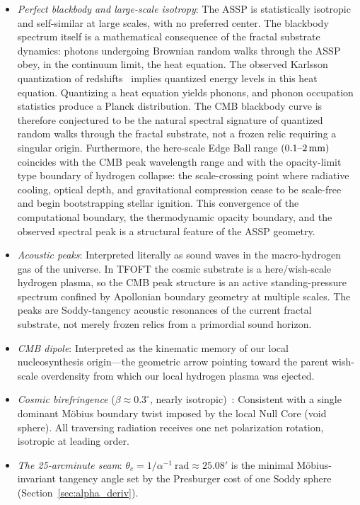 \documentclass[11pt,a4paper]{article}
\begin{document}
\begin{itemize}
  \item \textit{Perfect blackbody and large-scale isotropy}: The ASSP is statistically isotropic and self-similar at large scales, with no preferred center. The blackbody spectrum itself is a mathematical consequence of the fractal substrate dynamics: photons undergoing Brownian random walks through the ASSP obey, in the continuum limit, the heat equation. The observed Karlsson quantization of redshifts~\cite{Karlsson1971,Mal2020} implies quantized energy levels in this heat equation. Quantizing a heat equation yields phonons, and phonon occupation statistics produce a Planck distribution. The CMB blackbody curve is therefore conjectured to be the natural spectral signature of quantized random walks through the fractal substrate, not a frozen relic requiring a singular origin. Furthermore, the here-scale Edge Ball range \((0.1\text{--}2\,{\rm mm})\) coincides with the CMB peak wavelength range and with the opacity-limit type boundary of hydrogen collapse: the scale-crossing point where radiative cooling, optical depth, and gravitational compression cease to be scale-free and begin bootstrapping stellar ignition. This convergence of the computational boundary, the thermodynamic opacity boundary, and the observed spectral peak is a structural feature of the ASSP geometry.
  \item \textit{Acoustic peaks}: Interpreted literally as sound waves in the macro-hydrogen gas of the universe. In TFOFT the cosmic substrate is a here/wish-scale hydrogen plasma, so the CMB peak structure is an active standing-pressure spectrum confined by Apollonian boundary geometry at multiple scales. The peaks are Soddy-tangency acoustic resonances of the current fractal substrate, not merely frozen relics from a primordial sound horizon.
  \item \textit{CMB dipole}: Interpreted as the kinematic memory of our local nucleosynthesis origin---the geometric arrow pointing toward the parent wish-scale overdensity from which our local hydrogen plasma was ejected.
  \item \textit{Cosmic birefringence} ($\beta \approx 0.3^\circ$, nearly isotropic)~\cite{Minami2020}: Consistent with a single dominant Möbius boundary twist imposed by the local Null Core (void sphere). All traversing radiation receives one net polarization rotation, isotropic at leading order.
  \item \textit{The 25-arcminute seam}: $\theta_c = 1/\alpha^{-1}\ \text{rad} \approx 25.08'$ is the minimal Möbius-invariant tangency angle set by the Presburger cost of one Soddy sphere (Section~\ref{sec:alpha_deriv}).
\end{itemize}
\end{document}
